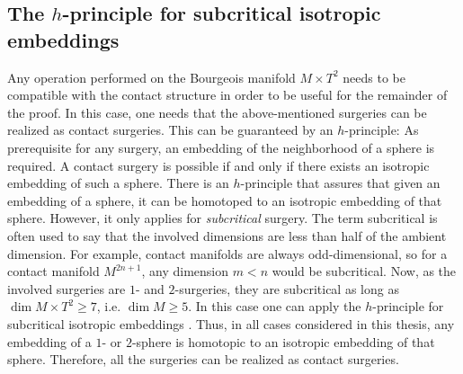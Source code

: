 \subsection{The $h$-principle for subcritical isotropic embeddings}
Any operation performed on the Bourgeois manifold $M\times T^2$ needs to be compatible with the contact structure
in order to be useful for the remainder of the proof.
In this case, one needs that the above-mentioned surgeries can be realized as contact surgeries.
This can be guaranteed by an $h$-principle:
As prerequisite for any surgery, an embedding of the neighborhood of a sphere is required. 
A contact surgery is possible if and only if there exists an isotropic embedding of such a sphere.
There is an $h$-principle that assures that given an embedding of a sphere, it can be homotoped to an isotropic embedding of that sphere.
However, it only applies for \textit{subcritical} surgery.
The term subcritical is often used to say that the involved dimensions are less than half of the ambient dimension.
For example, contact manifolds are always odd-dimensional, so for a contact manifold $M^{2n+1}$, any dimension $m < n$ would be subcritical.
Now, as the involved surgeries are $1$- and $2$-surgeries, they are subcritical as long as $\dim M\times T^2 \geq 7$, i.e. $\dim M \geq 5$.
In this case one can apply the $h$-principle for subcritical isotropic embeddings \cite[12.4.1]{EM02}.
Thus, in all cases considered in this thesis, any embedding of a $1$- or $2$-sphere is homotopic to an isotropic embedding of that sphere.
Therefore, all the surgeries can be realized as contact surgeries.